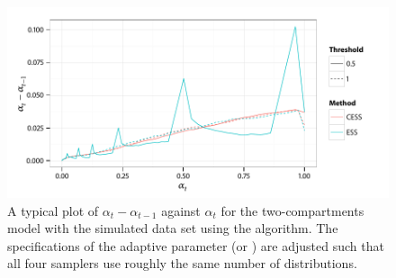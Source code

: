 \begin{figure}[t]
  \UseAltLinespread
  \includegraphics[width=\linewidth]{fig_src/Adaptive_Dist}
  \caption[Variations of the distribution specification parameter for the
  \protect\pet compartmental model using adaptive \protect\smc algorithms]
  {A typical plot of $\alpha_t - \alpha_{t-1}$ against $\alpha_t$ for the
    two-compartments \pet model with the simulated data set using the \smc[2]
    algorithm. The specifications of the adaptive parameter (\ess or \cess)
    are adjusted such that all four samplers use roughly the same number of
    distributions.}
  \label{fig:adaptive_alpha}
\end{figure}
